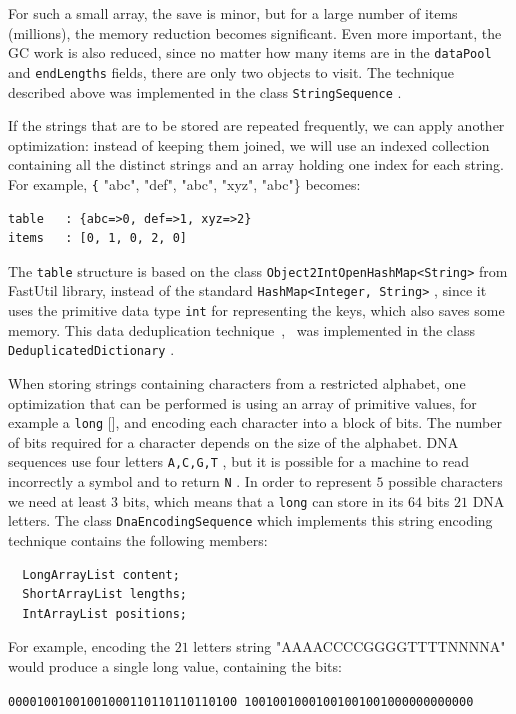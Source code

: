 \documentclass[a4paper,twoside]{article}
\begin{document}
For such a small array, the save is minor, but for a large number of items (millions), the memory reduction becomes significant.
Even more important, the GC work is also reduced, since no matter how many items are in the {\texttt{dataPool} } and {\texttt{endLengths} } fields, there are only two objects to visit.
The technique described above was implemented in the class {\texttt{StringSequence} }.

If the strings that are to be stored are repeated frequently, we can apply another optimization:
instead of keeping them joined, we will use an indexed collection containing all the distinct strings and an array holding one index for each string.
For example, {\texttt{\{} "abc", "def", "abc", "xyz", "abc"\} } becomes:
\begin{verbatim}
table   : {abc=>0, def=>1, xyz=>2}
items   : [0, 1, 0, 2, 0]
\end{verbatim}
The {\texttt{table} } structure is based on the class {\texttt{Object2IntOpenHashMap<String>} } from FastUtil library, instead of the standard {\texttt{HashMap<Integer, String>} }, since it uses the primitive data type {\texttt{int} } for representing the keys, which also saves some memory.
This data deduplication technique~\cite{he:2010},~\cite{manogar:2014} was implemented in the class {\texttt{DeduplicatedDictionary} }.

When storing strings containing characters from a restricted alphabet, one optimization that can be performed is using an array of primitive values, for example a {\texttt{long} []}, and encoding each character into a block of bits.
The number of bits required for a character depends on the size of the alphabet.
DNA sequences use four letters {\texttt{A,C,G,T} }, but it is possible for a machine to read incorrectly a symbol and to return {\texttt{N} }.
In order to represent $5$ possible characters we need at least $3$ bits,
which means that a {\texttt{long} } can store in its $64$ bits $21$ DNA letters.
The class {\texttt{DnaEncodingSequence} } which implements this string encoding technique contains the following members:
\begin{verbatim}
  LongArrayList content;
  ShortArrayList lengths;      
  IntArrayList positions;     
\end{verbatim}
For example, encoding the $21$ letters string "AAAACCCCGGGGTTTTNNNNA" would produce a single long value, containing the bits:\\
{\texttt{00001001001001000110110110110100
10010010001001001001000000000000}

}
\end{document}
